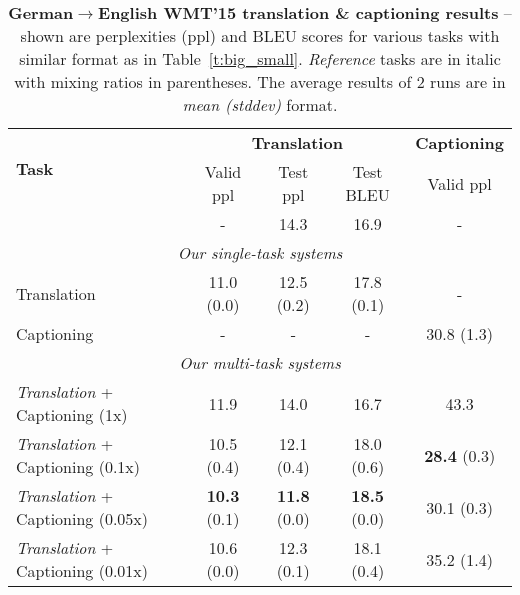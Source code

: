 \begin{table}[tbh!]
\centering
\begin{tabular}{l|c|c|c|c}
\multirow{ 2}{*}{\bf{Task}} & \multicolumn{3}{c|}{{\bf Translation}} &
\multicolumn{1}{c}{{\bf
Captioning}}\\
  \cline{2-5}
  & Valid ppl & Test ppl & Test BLEU & Valid ppl \\ %
  \hline
\citep{luong15attn} & - & 14.3 & 16.9 & - \\ %
  \hline
\multicolumn{5}{c}{{\it Our single-task systems}} \\
  \hline
Translation & 11.0 (0.0) & 12.5 (0.2) & 17.8 (0.1) & - \\ %
  \hline
Captioning & - & - & - & 30.8 (1.3) \\ %
  \hline
\multicolumn{5}{c}{{\it Our multi-task systems}} \\
  \hline
{\it Translation} + Captioning (1x) & 11.9 & 14.0 & 16.7 & 43.3 \\ %
{\it Translation} + Captioning (0.1x) &  10.5 (0.4) & 12.1 (0.4) & 18.0 (0.6) &
{\bf 28.4} (0.3) \\ %
{\it Translation} + Captioning (0.05x) &  {\bf 10.3} (0.1) &  {\bf 11.8} (0.0) &
{\bf 18.5} (0.0) & 30.1 (0.3) \\ %
{\it Translation} + Captioning (0.01x) &  10.6 (0.0) & 12.3 (0.1)& 18.1 (0.4) & 35.2 (1.4)
\\ %
\end{tabular}
\caption{{\bf German$\rightarrow$English WMT'15 translation \& captioning results} -- shown are
perplexities (ppl) and BLEU scores 
for various tasks with similar format as
in Table~\ref{t:big_small}. {\it Reference} tasks are in italic with mixing
ratios in parentheses. The average results of 2 runs are in {\it
mean (stddev)} format.} %
\label{t:big_medium}
\end{table}


